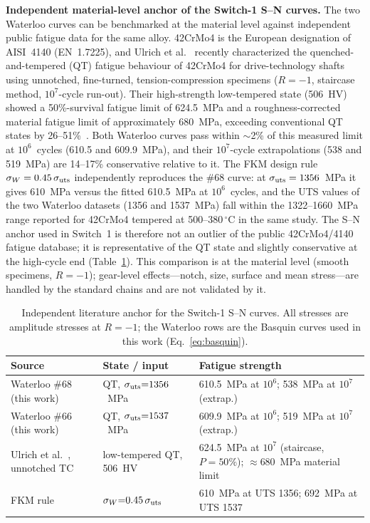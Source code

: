 \documentclass[twocolumn,12pt,a4paper]{article}
\begin{document}
\textbf{Independent material-level anchor of the Switch-1 S--N curves.}
The two Waterloo curves can be benchmarked at the material level
against independent public fatigue data for the same alloy.
42CrMo4 is the European designation of AISI~4140 (EN~1.7225), and
Ulrich et al.~\cite{ulrich2025} recently characterized the
quenched-and-tempered (QT) fatigue behaviour of 42CrMo4 for
drive-technology shafts using unnotched, fine-turned,
tension-compression specimens ($R=-1$, staircase method,
$10^7$-cycle run-out). Their high-strength low-tempered state
(506~HV) showed a 50\%-survival fatigue limit of 624.5~MPa and a
roughness-corrected material fatigue limit of approximately 680~MPa,
exceeding conventional QT states by 26--51\%~\cite{ulrich2025}. Both
Waterloo curves pass within $\sim$2\% of this measured limit at
$10^6$~cycles (610.5 and 609.9~MPa), and their $10^7$-cycle
extrapolations (538 and 519~MPa) are 14--17\% conservative relative
to it. The FKM design rule $\sigma_W = 0.45\,\sigma_{\rm uts}$
independently reproduces the \#68 curve: at
$\sigma_{\rm uts}=1356$~MPa it gives 610~MPa versus the fitted
610.5~MPa at $10^6$~cycles, and the UTS values of the two Waterloo
datasets (1356 and 1537~MPa) fall within the 1322--1660~MPa range
reported for 42CrMo4 tempered at 500--380\,$^\circ$C in the same
study. The S--N anchor used in Switch~1 is therefore not an outlier
of the public 42CrMo4/4140 fatigue database; it is representative of
the QT state and slightly conservative at the high-cycle end
(Table~\ref{tab:sn_anchor}). This comparison is at the material
level (smooth specimens, $R=-1$); gear-level effects---notch, size,
surface and mean stress---are handled by the standard chains and are
not validated by it.

\begin{table}[h]
\centering
\caption{Independent literature anchor for the Switch-1 S--N curves.
All stresses are amplitude stresses at $R=-1$; the Waterloo rows are
the Basquin curves used in this work (Eq.~\ref{eq:basquin}).}
\label{tab:sn_anchor}
\footnotesize
\begin{tabular}{@{}p{2.1cm}p{2.0cm}p{3.3cm}@{}}
\toprule
Source & State / input & Fatigue strength \\
\midrule
\raggedright Waterloo \#68 (this work) &
\raggedright QT, $\sigma_{\rm uts}{=}1356$~MPa &
\raggedright 610.5~MPa at $10^6$; 538~MPa at $10^7$ (extrap.) \\
\raggedright Waterloo \#66 (this work) &
\raggedright QT, $\sigma_{\rm uts}{=}1537$~MPa &
\raggedright 609.9~MPa at $10^6$; 519~MPa at $10^7$ (extrap.) \\
\raggedright Ulrich et al.~\cite{ulrich2025}, unnotched TC &
\raggedright low-tempered QT, 506~HV &
\raggedright 624.5~MPa at $10^7$ (staircase, $P{=}50\%$);
$\approx$680~MPa material limit \\
\raggedright FKM rule~\cite{fkm} &
\raggedright $\sigma_W{=}0.45\,\sigma_{\rm uts}$ &
\raggedright 610~MPa at UTS 1356; 692~MPa at UTS 1537 \\
\bottomrule
\end{tabular}
\end{table}
\end{document}

